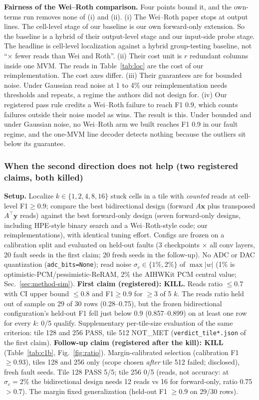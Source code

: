 \documentclass[journal]{IEEEtran}
\begin{document}
\textbf{Fairness of the Wei--Roth comparison.} Four points bound it, and the own-terms run removes none of (i) and (ii).
(i) The Wei--Roth paper stops at output lines. The cell-level stage of our baseline is our own forward-only extension. So the baseline is a hybrid of their output-level stage and our input-side probe stage. The headline is cell-level localization against a hybrid group-testing baseline, not ``$\times$ fewer reads than Wei and Roth''.
(ii) Their cost unit is $r$ redundant columns inside one MVM. The reads in Table~\ref{tab:loc} are the cost of our reimplementation. The cost axes differ.
(iii) Their guarantees are for bounded noise. Under Gaussian read noise at 1 to 4\% our reimplementation needs thresholds and repeats, a regime the authors did not design for.
(iv) Our registered pass rule credits a Wei--Roth failure to reach F1 0.9, which counts failures outside their noise model as wins.
The result is this. Under bounded and under Gaussian noise, no Wei--Roth arm we built reaches F1 0.9 in our fault regime, and the one-MVM line decoder detects nothing because the outliers sit below its guarantee.

\subsubsection{When the second direction does not help (two registered claims, both killed)}
\textbf{Setup.} Localize $k\in\{1,2,4,8,16\}$ stuck cells in a tile with \emph{counted} reads at cell-level F1$\ge0.9$; compare the best bidirectional design
(forward $A\mathbf x$ plus transposed $A^{\!\top}\mathbf y$ reads) against the best forward-only design (seven forward-only designs, including HPE-style binary search and a Wei--Roth-style code; our reimplementations),
with identical tuning effort. Configs are frozen on a calibration split and evaluated on held-out faults (3 checkpoints $\times$ all conv layers, 20 fault seeds in the first claim; 20 fresh seeds in the follow-up).
No ADC or DAC quantization (\texttt{adc\_bits=None}); read noise $\sigma_c\in\{1\%,2\%\}$ of $\max|w|$ (1\% is optimistic-PCM/pessimistic-ReRAM, 2\% the AIHWKit PCM central value; Sec.~\ref{sec:method-sim}).
\textbf{First claim (registered): KILL.} Reads ratio $\le0.7$ with CI upper bound $\le0.8$ and F1$\ge0.9$ for $\ge3$ of 5 $k$.
The reads ratio held out of sample on 29 of 30 rows (0.28--0.75), but the frozen bidirectional configuration's held-out F1 fell just below 0.9 (0.857--0.899) on at least one row for every $k$: 0/5 qualify.
Supplementary per-tile-size evaluation of the same criterion: tile 128 and 256 PASS, tile 512 NOT\_MET (\texttt{verdict\_tile*.json} of the first claim).
\textbf{Follow-up claim (registered after the kill): KILL} (Table~\ref{tab:c1b}, Fig.~\ref{fig:ratio}). Margin-calibrated selection (calibration F1$\ge0.93$), tiles 128 and 256 only (scope chosen \emph{after} tile 512 failed; disclosed), fresh fault seeds. Tile 128 PASS 5/5; tile 256 0/5 (reads, not accuracy:
at $\sigma_c=2\%$ the bidirectional design needs 12 reads vs 16 for forward-only, ratio 0.75 $>0.7$). The margin fixed generalization (held-out F1 $\ge0.9$ on 29/30 rows).
\end{document}
